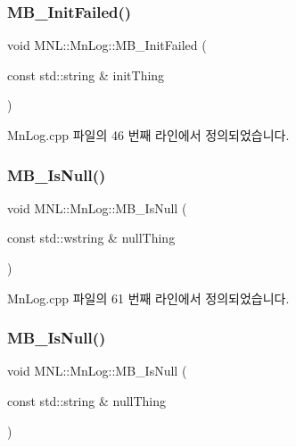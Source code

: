 \subsubsection{\texorpdfstring{M\+B\+\_\+\+Init\+Failed()}{MB\_InitFailed()}\hspace{0.1cm}{\footnotesize\ttfamily [2/2]}}
{\footnotesize\ttfamily void M\+N\+L\+::\+Mn\+Log\+::\+M\+B\+\_\+\+Init\+Failed (\begin{DoxyParamCaption}\item[{const std\+::string \&}]{init\+Thing }\end{DoxyParamCaption})}



Mn\+Log.\+cpp 파일의 46 번째 라인에서 정의되었습니다.

\mbox{\label{namespace_m_n_l_1_1_mn_log_a980ff7e858520fc4e4be3fb31fa3e0f2}} 
\subsubsection{\texorpdfstring{M\+B\+\_\+\+Is\+Null()}{MB\_IsNull()}\hspace{0.1cm}{\footnotesize\ttfamily [1/2]}}
{\footnotesize\ttfamily void M\+N\+L\+::\+Mn\+Log\+::\+M\+B\+\_\+\+Is\+Null (\begin{DoxyParamCaption}\item[{const std\+::wstring \&}]{null\+Thing }\end{DoxyParamCaption})}



Mn\+Log.\+cpp 파일의 61 번째 라인에서 정의되었습니다.

\mbox{\label{namespace_m_n_l_1_1_mn_log_a0bc5bf2479ea5d36919d57a6c4ec6caa}} 
\subsubsection{\texorpdfstring{M\+B\+\_\+\+Is\+Null()}{MB\_IsNull()}\hspace{0.1cm}{\footnotesize\ttfamily [2/2]}}
{\footnotesize\ttfamily void M\+N\+L\+::\+Mn\+Log\+::\+M\+B\+\_\+\+Is\+Null (\begin{DoxyParamCaption}\item[{const std\+::string \&}]{null\+Thing }\end{DoxyParamCaption})}



